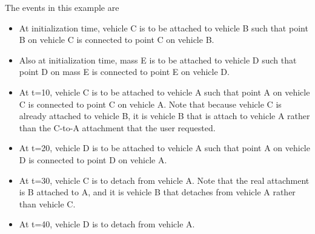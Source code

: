 The events in this example are
\begin{itemize}
\item At initialization time, vehicle C is to be attached to vehicle B
  such that point B on vehicle C is connected to point C on vehicle B.
\item Also at initialization time, mass E is to be attached to vehicle D
  such that point D on mass E is connected to point E on vehicle D.
\item At t=10, vehicle C is to be attached to vehicle A
  such that point A on vehicle C is connected to point C on vehicle A.
  Note that because vehicle C is already attached to vehicle B,
  it is vehicle B that is attach to vehicle A rather than the C-to-A
  attachment that the user requested.
\item At t=20, vehicle D is to be attached to vehicle A
  such that point A on vehicle D is connected to point D on vehicle A.
\item At t=30, vehicle C is to detach from vehicle A.
 Note that the real attachment is B attached to A, and it is vehicle
 B that detaches from vehicle A rather than vehicle C.
\item At t=40, vehicle D is to detach from vehicle A.
\end{itemize}


